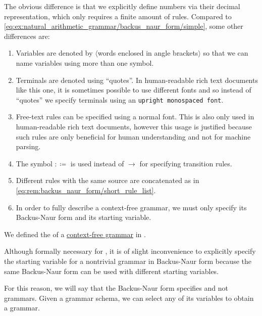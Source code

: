 \begin{example}
  The obvious difference is that we explicitly define numbers via their decimal representation, which only requires a finite amount of rules. Compared to \eqref{eq:ex:natural_arithmetic_grammar/backus_naur_form/simple}, some other differences are:
  \begin{enumerate}
    \item Variables are denoted by \( \langle \)words enclosed in angle brackets\( \rangle \) so that we can name variables using more than one symbol.
    \item Terminals are denoted using \enquote{quotes}. In human-readable rich text documents like this one, it is sometimes possible to use different fonts and so instead of \enquote{quotes} we specify terminals using an \texttt{upright monospaced font}.
    \item Free-text rules can be specified using a normal font. This is also only used in human-readable rich text documents, however this usage is justified because such rules are only beneficial for human understanding and not for machine parsing.
    \item The symbol \( :\coloneqq \) is used instead of \( \to \) for specifying transition rules.
    \item Different rules with the same source are concatenated as in \eqref{eq:rem:backus_naur_form/short_rule_list}.
    \item In order to fully describe a context-free grammar, we must only specify its Backus-Naur form and its starting variable.
  \end{enumerate}
\end{example}

\begin{definition}\label{def:backus_naur_form}
  We defined the  of a \hyperref[def:grammar/context_free]{context-free grammar} in .

  Although formally necessary for , it is of slight inconvenience to explicitly specify the starting variable for a nontrivial grammar in Backus-Naur form because the same Backus-Naur form can be used with different starting variables.

  For this reason, we will say that the Backus-Naur form specifies  and not grammars. Given a grammar schema, we can select any of its variables to obtain a grammar.
\end{definition}

